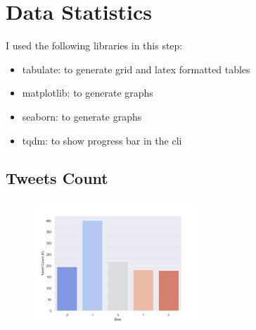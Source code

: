 \documentclass[11pt]{article}
\begin{document}
\section{Data Statistics}
I used the following libraries in this step:
\begin{itemize}
  \item tabulate: to generate grid and latex formatted tables
  \item matplotlib: to generate graphs
  \item seaborn: to generate graphs
  \item tqdm: to show progress bar in the cli
\end{itemize}

\pagebreak

\subsection{Tweets Count}
\begin{center}
  
\CountTweetsTable
\begin{figure}[h!]
  \includegraphics[width=0.55\textwidth]{figs/count_tweets/count_tweets.png}
\end{figure}
\end{center}

\end{document}
